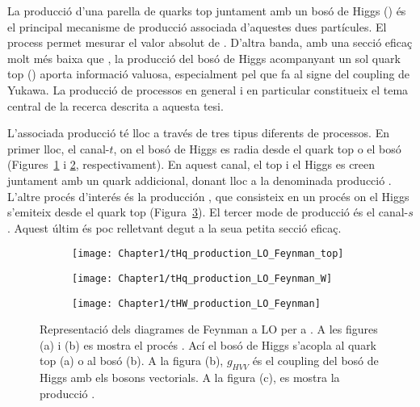 La producció d'una parella de quarks top juntament amb un bosó de Higgs (\ttH) és el 
principal mecanisme de producció associada d'aquestes dues partícules. El process \ttH permet 
mesurar el valor absolut de \yt. D'altra banda, amb una secció eficaç molt més baixa que \ttH, 
la producció del bosó de Higgs acompanyant un sol quark top (\tH) aporta informació valuosa, 
especialment pel que fa al signe del coupling de Yukawa. La producció de processos \tH en general
i \tHq en particular constitueix el tema central de la recerca descrita a aquesta tesi.   

L'associada producció \tH té lloc a través de tres tipus diferents de processos. En primer lloc, el canal-$t$, 
on el bosó de Higgs es radia desde el quark top o el bosó \PW (Figures~\ref{fig:Resum:tHq:Feynman_LO_top} i 
\ref{fig:Resum:tHq:Feynman_LO_W}, respectivament). En aquest canal, el top i el Higgs es creen juntament 
amb un quark addicional, donant lloc a la denominada producció \tHq. L'altre procés d'interés és la producción
\tWH, que consisteix en un procés \tW on el Higgs s'emiteix desde el quark top (Figura~\ref{fig:Resum:tHW:Feynman_LO}).
El tercer mode de producció és el canal-$s$. Aquest últim és poc relletvant degut a la seua petita secció eficaç.

\begin{figure}
\centering
 \begin{subfigure}{.29\textwidth}
  \centering
  \texttt{[image: Chapter1/tHq\_production\_LO\_Feynman\_top]}
  \caption{\tHq}
  \label{fig:Resum:tHq:Feynman_LO_top}
 \end{subfigure}%
 \begin{subfigure}{.29\textwidth}%
  \centering
  \texttt{[image: Chapter1/tHq\_production\_LO\_Feynman\_W]}
  \caption{\tHq}
  \label{fig:Resum:tHq:Feynman_LO_W}
 \end{subfigure}%
 \begin{subfigure}{.29\textwidth}
  \centering
  \texttt{[image: Chapter1/tHW\_production\_LO\_Feynman]}
  \caption{\tWH}
  \label{fig:Resum:tHW:Feynman_LO}
 \end{subfigure}%
    \caption{Representació dels diagrames de Feynman a LO per a \tH. A les figures (a) i (b) 
    es mostra el procés \tHq. Ací el bosó de Higgs s'acopla al quark top (a) o al bosó \PW (b). 
    A la figura (b), $g_{HVV}$ és el coupling del bosó de Higgs amb els bosons vectorials. 
    A la figura (c), es mostra la producció \tWH.}
    \label{fig:Resum:tHq:Feynman_LO}
\end{figure}
 
